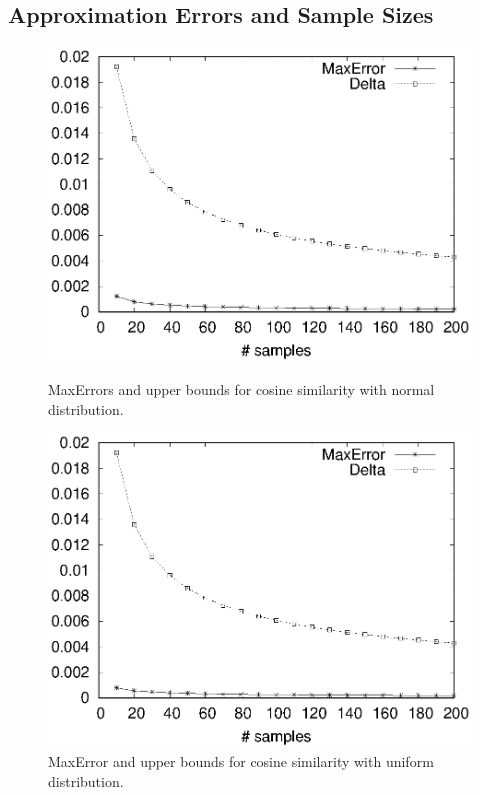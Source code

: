 \documentclass{article}
\begin{document}
\subsection{Approximation Errors and Sample Sizes}

\begin{figure}[!t]
\centering
\begin{minipage}{.45\textwidth}
\centering
\includegraphics[width=.9\textwidth]{cos_normal_apprx_error.eps}
\caption{\textsf{MaxError}s and upper bounds for cosine similarity with normal distribution.}
\label{fig:cnae}
\end{minipage}
\hspace{1cm}
\begin{minipage}{.45\textwidth}
\centering
\includegraphics[width=.9\textwidth]{cos_uniform_apprx_error.eps}
\caption{\textsf{MaxError} and upper bounds for cosine similarity with uniform distribution.}
\label{fig:cuae}
\end{minipage}
\end{figure}
\end{document}

